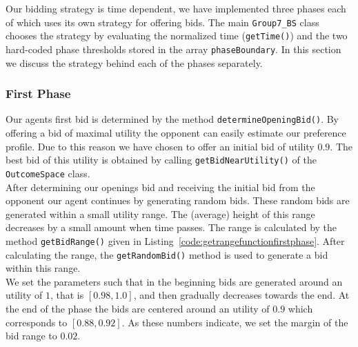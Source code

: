 Our bidding strategy is time dependent, we have implemented three phases each of which uses its own strategy for offering bids. The main \texttt{Group7\_BS} class chooses the strategy by evaluating the normalized time (\texttt{getTime()}) and the two hard-coded phase thresholds stored in the array \texttt{phaseBoundary}. In this section we discuss the strategy behind each of the phases separately.

\subsubsection{First Phase}
Our agents first bid is determined by the method \texttt{determineOpeningBid()}. By offering a bid of maximal utility the opponent can easily estimate our preference profile. Due to this reason we have chosen to offer an initial bid of utility $0.9$. The best bid of this utility is obtained by calling \texttt{getBidNearUtility()} of the \texttt{OutcomeSpace} class. \\

After determining our openings bid and receiving the initial bid from the opponent our agent continues by generating random bids. These random bids are generated within a small utility range. The (average) height of this range decreases by a small amount when time passes. The range is calculated by the method \texttt{getBidRange()} given in Listing~\ref{code:getrangefunctionfirstphase}. After calculating the range, the \texttt{getRandomBid()} method is used to generate a bid within this range. \\

We set the parameters such that in the beginning bids are generated around an utility of $1$, that is $[0.98, 1.0]$, and then gradually decreases towards the end. At the end of the phase the bids are centered around an utility of $0.9$ which corresponds to $[0.88, 0.92]$. As these numbers indicate, we set the margin of the bid range to $0.02$. 

